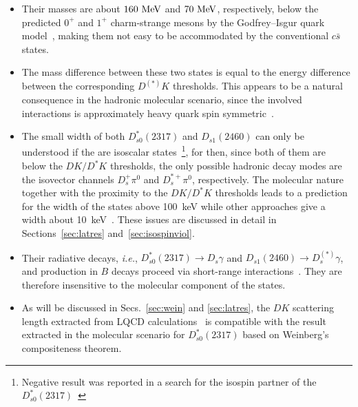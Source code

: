 \begin{itemize}
  
\item Their masses are about $160~\mathrm{MeV}$ and  $70~\mathrm{MeV}$, respectively, below the
predicted $0^+$ and $1^+$ charm-strange mesons by the Godfrey--Isgur quark
model~\cite{Godfrey:1985xj,DiPierro:2001dwf}, making them not easy to be
accommodated by the conventional $c\bar{s}$ states.

\item {The mass difference between these two states is equal to the energy
difference between the corresponding $D^{(*)}K$  thresholds. 
This appears to be
 a natural
consequence in the hadronic molecular scenario, since the involved interactions
is approximately heavy quark spin symmetric~\cite{Guo:2009id}.}

\item {The small width of both $D_{s0}^*(2317)$ and $D_{s1}(2460)$
can only be understood if the are isoscalar states~\footnote{Negative result was reported in a search for
the isospin partner of the $D_{s0}^*(2317)$~\cite{Choi:2015lpc}}, for then,
since both of them are below the $DK/D^*K$  thresholds, the only possible
hadronic decay modes are the isovector channels $D_s^+\pi^0$ and
$D_s^{*+}\pi^0$, respectively.} The molecular nature together with the proximity
to the $DK/D^*K$ thresholds leads to a prediction for the width of the states
above 100~keV while other approaches give a width about
10~keV~\cite{Colangelo:2003vg,Godfrey:2003kg}.
These issues are discussed in detail in Sections~\ref{sec:latres}
and~\ref{sec:isospinviol}.

\item  Their radiative decays, {\sl i.e.}, $D_{s0}^*(2317)\to D_s \gamma$ and 
$D_{s1}(2460)\to D^{(*)}_s \gamma$, and production in $B$ decays proceed via
short-range interactions~\cite{Lutz:2007sk,Chen:2013upa,Cleven:2014oka}.
They are therefore insensitive to the molecular component of the states.

\item As will be discussed in Secs.~\ref{sec:wein} and \ref{sec:latres}, the
$DK$ scattering length extracted from LQCD {calculations}~\cite{Liu:2012zya} is
compatible with the result extracted in the molecular scenario for
$D_{s0}^*(2317)$ based on Weinberg's compositeness theorem.

\end{itemize}

